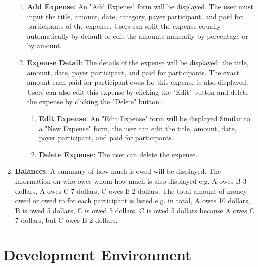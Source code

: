 \documentclass[conference]{IEEEtran}
\begin{document}
\begin{enumerate}
    \begin{enumerate}
        \item\textbf {Add Expense}: An "Add Expense" form will be displayed. The user must input the title, amount, date, category, payer participant, and paid for participants of the expense. Users can split the expense equally automatically by default or edit the amounts manually by percentage or by amount.
        \item\textbf {Expense Detail}: The details of the expense will be displayed: the title, amount, date, payer participant, and paid for participants. The exact amount each paid for participant owes for this expense is also displayed. Users can also edit this expense by clicking the "Edit" button and delete the expense by clicking the "Delete" button.
        \begin{enumerate}
            \item \textbf {Edit Expense}: An "Edit Expense" form will be displayed Similar to a "New Expense" form, the user can edit the title, amount, date, payer participant, and paid for participants.
            \item \textbf {Delete Expense}: The user can delete the expense.
        \end{enumerate}
    \end{enumerate}
    \item \textbf {Balances}: A summary of how much is owed will be displayed. The information on who owes whom how much is also displayed e.g. A owes B 3 dollars, A owes C 7 dollars, C owes B 2 dollars. The total amount of money owed or owed to for each participant is listed e.g. in total, A owes 10 dollars, B is owed 5 dollars, C is owed 5 dollars. C is owed 5 dollars because A owes C 7 dollars, but C owes B 2 dollars.
\end{enumerate}

\section{Development Environment}
\end{document}
